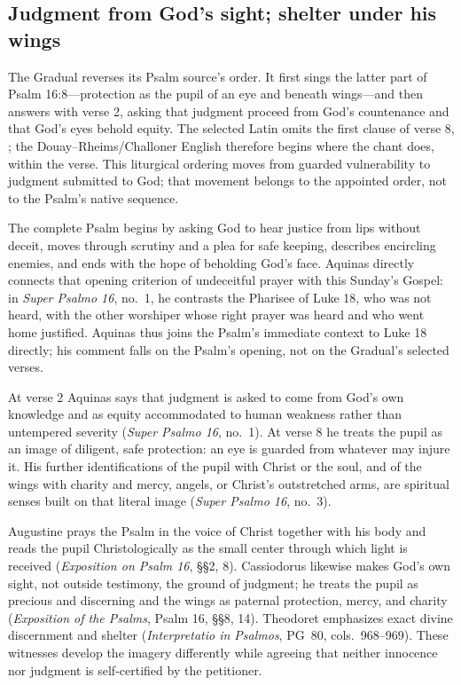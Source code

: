 \sectionguard
\subsection*{Judgment from God's sight; shelter under his wings\enspace{}}

The Gradual reverses its Psalm source's order. It first sings the latter part
of Psalm 16:8---protection as the pupil of an eye and beneath wings---and then
answers with verse 2, asking that judgment proceed from God's countenance and
that God's eyes behold equity. The selected Latin omits the first clause of
verse 8, ; the
Douay--Rheims/Challoner English therefore begins where the chant does, within
the verse. This liturgical ordering moves from guarded vulnerability to
judgment submitted to God; that movement belongs to the appointed order, not
to the Psalm's native sequence.

The complete Psalm begins by asking God to hear justice from lips without
deceit, moves through scrutiny and a plea for safe keeping, describes
encircling enemies, and ends with the hope of beholding God's face. Aquinas
directly connects that opening criterion of undeceitful prayer with this
Sunday's Gospel: in \emph{Super Psalmo 16}, no.~1, he contrasts the Pharisee
of Luke 18, who was not heard, with the other worshiper whose right prayer was
heard and who went home justified. Aquinas thus joins the Psalm's immediate
context to Luke 18 directly; his comment falls on the Psalm's opening, not on
the Gradual's selected verses.

At verse 2 Aquinas says that judgment is asked to come from God's own
knowledge and as equity accommodated to human weakness rather than untempered
severity (\emph{Super Psalmo 16}, no.~1). At verse 8 he treats the pupil as an
image of diligent, safe protection: an eye is guarded from whatever may injure
it. His further identifications of the pupil with Christ or the soul, and of
the wings with charity and mercy, angels, or Christ's outstretched arms, are
spiritual senses built on that literal image (\emph{Super Psalmo 16},
no.~3).

Augustine prays the Psalm in the voice of Christ together with his body and
reads the pupil Christologically as the small center through which light is
received (\emph{Exposition on Psalm 16}, §§2, 8). Cassiodorus likewise makes
God's own sight, not outside testimony, the ground of judgment; he treats the
pupil as precious and discerning and the wings as paternal protection, mercy,
and charity (\emph{Exposition of the Psalms}, Psalm 16, §§8, 14).
Theodoret emphasizes exact divine discernment and shelter
(\emph{Interpretatio in Psalmos}, PG~80, cols.~968--969). These witnesses
develop the imagery differently while agreeing that neither innocence nor
judgment is self-certified by the petitioner.

